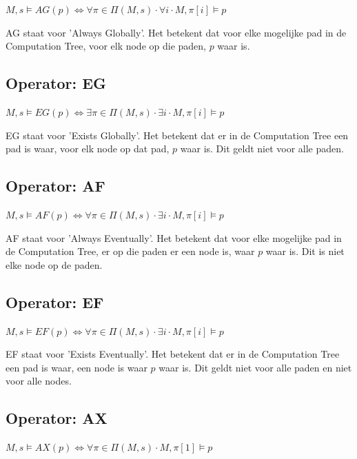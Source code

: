 \documentclass{article}
\begin{document}
		\( M, s \models AG(p) \iff \forall \pi \in \Pi (M, s) \cdot \forall i \cdot M, \pi [i] \models p\)

		AG staat voor 'Always Globally'. Het betekent dat voor elke mogelijke pad in de Computation Tree, voor elk node op die paden, \( p \) waar is.
		
		\subsection{Operator: EG}
				
		\( M, s \models EG(p) \iff \exists \pi \in \Pi (M, s) \cdot \exists i \cdot M, \pi [i] \models p\)

		EG staat voor 'Exists Globally'. Het betekent dat er in de Computation Tree een pad is waar, voor elk node op dat pad, \( p \) waar is. Dit geldt niet voor alle paden.
		
		\subsection{Operator: AF}
				
		\( M, s \models AF(p) \iff \forall \pi \in \Pi (M, s) \cdot \exists i \cdot M, \pi [i] \models p\)

		AF staat voor 'Always Eventually'. Het betekent dat voor elke mogelijke pad in de Computation Tree, er op die paden er een node is, waar \( p \) waar is. Dit is niet elke node op de paden.
		
		\subsection{Operator: EF}
				
		\( M, s \models EF(p) \iff \forall \pi \in \Pi (M, s) \cdot \exists i \cdot M, \pi [i] \models p\)

		EF staat voor 'Exists Eventually'. Het betekent dat er in de Computation Tree een pad is waar, een node is waar \( p \) waar is. Dit geldt niet voor alle paden en niet voor alle nodes.
		
		\subsection{Operator: AX}
				
		\( M, s \models AX(p) \iff \forall \pi \in \Pi (M, s) \cdot M, \pi [1] \models p\)
\end{document}

